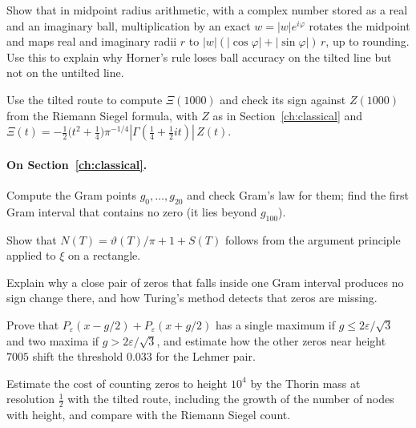 \begin{exercises}
\item\label{ex:ch4:horner} Show that in midpoint radius arithmetic, with a complex number stored as a real and an imaginary ball, multiplication by an exact $w=|w|e^{i\varphi}$ rotates the midpoint and maps real and imaginary radii $r$ to $|w|(|\cos\varphi|+|\sin\varphi|)\,r$, up to rounding. Use this to explain why Horner's rule loses ball accuracy on the tilted line but not on the untilted line.
\item Use the tilted route to compute $\Xi(1000)$ and check its sign against $Z(1000)$ from the Riemann Siegel formula, with $Z$ as in Section~\ref{ch:classical} and $\Xi(t)=-\tfrac12\big(t^2+\tfrac14\big)\pi^{-1/4}|\Gamma(\tfrac14+\tfrac12it)|\,Z(t)$.
\end{exercises}

\paragraph{On Section~\ref{ch:classical}.}
\begin{exercises}
\item Compute the Gram points $g_0,\dots,g_{20}$ and check Gram's law for them; find the first Gram interval that contains no zero (it lies beyond $g_{100}$).
\item Show that $N(T)=\vartheta(T)/\pi+1+S(T)$ follows from the argument principle applied to $\xi$ on a rectangle.
\item Explain why a close pair of zeros that falls inside one Gram interval produces no sign change there, and how Turing's method detects that zeros are missing.
\item\label{ex:ch5:cauchy} Prove that $P_\varepsilon(x-g/2)+P_\varepsilon(x+g/2)$ has a single maximum if $g\le2\varepsilon/\sqrt3$ and two maxima if $g>2\varepsilon/\sqrt3$, and estimate how the other zeros near height $7005$ shift the threshold $0.033$ for the Lehmer pair.
\item Estimate the cost of counting zeros to height $10^4$ by the Thorin mass at resolution $\frac12$ with the tilted route, including the growth of the number of nodes with height, and compare with the Riemann Siegel count.
\end{exercises}

